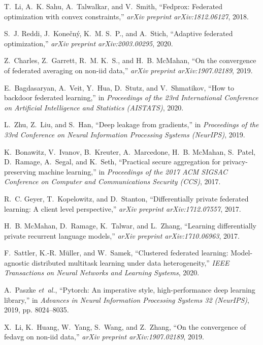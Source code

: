 \documentclass[conference]{IEEEtran}
\begin{document}
\begin{thebibliography}{1}
T.~Li, A.~K. Sahu, A.~Talwalkar, and V.~Smith, ``Fedprox: Federated
  optimization with convex constraints,'' \emph{arXiv preprint
  arXiv:1812.06127}, 2018.

S.~J. Reddi, J.~Konečný, K.~M. S.~P., and A.~Stich, ``Adaptive federated
  optimization,'' \emph{arXiv preprint arXiv:2003.00295}, 2020.

Z.~Charles, Z.~Garrett, R.~M. K.~S., and H.~B. McMahan, ``On the convergence of
  federated averaging on non-iid data,'' \emph{arXiv preprint
  arXiv:1907.02189}, 2019.

E.~Bagdasaryan, A.~Veit, Y.~Hua, D.~Stutz, and V.~Shmatikov, ``How to backdoor
  federated learning,'' in \emph{Proceedings of the 23rd International
  Conference on Artificial Intelligence and Statistics (AISTATS)}, 2020.

L.~Zhu, Z.~Liu, and S.~Han, ``Deep leakage from gradients,'' in
  \emph{Proceedings of the 33rd Conference on Neural Information Processing
  Systems (NeurIPS)}, 2019.

K.~Bonawitz, V.~Ivanov, B.~Kreuter, A.~Marcedone, H.~B. McMahan, S.~Patel,
  D.~Ramage, A.~Segal, and K.~Seth, ``Practical secure aggregation for
  privacy-preserving machine learning,'' in \emph{Proceedings of the 2017 ACM
  SIGSAC Conference on Computer and Communications Security (CCS)}, 2017.

R.~C. Geyer, T.~Kopelowitz, and D.~Stanton, ``Differentially private federated
  learning: A client level perspective,'' \emph{arXiv preprint
  arXiv:1712.07557}, 2017.

H.~B. McMahan, D.~Ramage, K.~Talwar, and L.~Zhang, ``Learning
  differentially private recurrent language models,'' \emph{arXiv preprint
  arXiv:1710.06963}, 2017.

F.~Sattler, K.-R. Müller, and W.~Samek, ``Clustered federated learning:
  Model-agnostic distributed multitask learning under data heterogeneity,''
  \emph{IEEE Transactions on Neural Networks and Learning Systems}, 2020.

A.~Paszke \emph{et~al.}, ``Pytorch: An imperative style, high-performance deep
  learning library,'' in \emph{Advances in Neural Information Processing Systems
  32 (NeurIPS)}, 2019, pp. 8024--8035.

X.~Li, K.~Huang, W.~Yang, S.~Wang, and Z.~Zhang, ``On the convergence of
  fedavg on non-iid data,'' \emph{arXiv preprint arXiv:1907.02189}, 2019.


\end{thebibliography}
\end{document}
